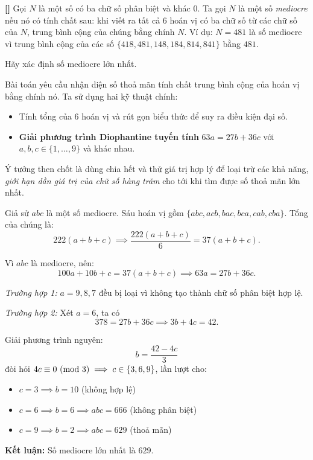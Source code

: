 \documentclass[../01-divisibility.tex]{subfiles}
\begin{document}
\begin{example*}\label{example:CAN-2015-QRC-P3}\textbf{[]}
	Gọi \( N \) là một số có ba chữ số phân biệt và khác 0. Ta gọi \( N \) là một số \textit{mediocre} nếu nó có tính chất sau:
	khi viết ra tất cả 6 hoán vị có ba chữ số từ các chữ số của \( N \), trung bình cộng của chúng bằng chính \( N \).
	Ví dụ: \( N = 481 \) là số mediocre vì trung bình cộng của các số \( \{418, 481, 148, 184, 814, 841\} \) bằng \( 481 \).

	Hãy xác định số mediocre lớn nhất.	
\end{example*}

\begin{story*}
	Bài toán yêu cầu nhận diện số thoả mãn tính chất trung bình cộng của hoán vị bằng chính nó. 
	Ta sử dụng hai kỹ thuật chính:
	\begin{itemize}[topsep=0pt, partopsep=0pt, itemsep=0pt]
	    \item Tính tổng của 6 hoán vị và rút gọn biểu thức để suy ra điều kiện đại số.
	    \item \textbf{Giải phương trình Diophantine tuyến tính} \( 63a = 27b + 36c \) với \( a, b, c \in \{1, \ldots, 9\} \) và khác nhau.
	\end{itemize}
	Ý tưởng then chốt là dùng chia hết và thử giá trị hợp lý để loại trừ các khả năng, \textit{giới hạn dần giá trị của chữ số hàng trăm} cho tới khi tìm được số thoả mãn lớn nhất.
\end{story*}

\begin{soln}\footnotemark
	Giả sử \( abc \) là một số mediocre. Sáu hoán vị gồm \( \{abc, acb, bac, bca, cab, cba\} \). Tổng của chúng là:
	\[
		222(a + b + c) \implies \frac{222(a + b + c)}{6} = 37(a + b + c).
	\]

	Vì \( abc \) là mediocre, nên:
	\[
		100a + 10b + c = 37(a + b + c) \implies 63a = 27b + 36c.
	\]

	\textit{Trường hợp 1:} \( a = 9, 8, 7 \) đều bị loại vì không tạo thành chữ số phân biệt hợp lệ.

	\textit{Trường hợp 2:} Xét \( a = 6 \), ta có
	\[
		378 = 27b + 36c \implies 3b + 4c = 42.
	\]

	Giải phương trình nguyên:
	\[
		b = \frac{42 - 4c}{3}
	\]
	đòi hỏi \( 4c \equiv 0 \ (\mathrm{mod}\ 3) \implies c \in \{3, 6, 9\} \), lần lượt cho:
	\begin{itemize}[topsep=0pt, partopsep=0pt, itemsep=0pt]
	    \item \( c = 3 \implies b = 10 \) (không hợp lệ)
	    \item \( c = 6 \implies b = 6 \implies abc = 666 \) (không phân biệt)
	    \item \( c = 9 \implies b = 2 \implies abc = 629 \) (thoả mãn)
	\end{itemize}

	\textbf{Kết luận:} Số mediocre lớn nhất là \( \boxed{629} \).
\end{soln}

\end{document}

